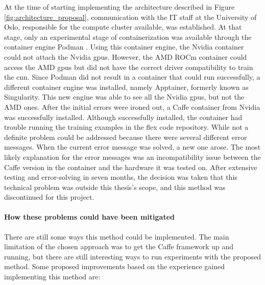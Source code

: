             At the time of starting implementing the architecture described in Figure \ref{fig:architecture_proposal}, communication with the IT staff at the University of Oslo, responsible for the compute cluster available, was established. At that stage, only an experimental stage of containerization was available through the container engine Podman \cite{Podman}. Using this container engine, the Nvidia container could not attach the Nvidia \glspl{gpu}. However, the AMD ROCm container could access the AMD \glspl{gpu} but did not have the correct driver compatibility to train the \gls{cnn}. Since Podman did not result in a container that could run successfully, a different container engine was installed, namely Apptainer, formerly known as Singularity. This new engine was able to see all the Nvidia \glspl{gpu}, but not the AMD ones. After the initial errors were ironed out, a Caffe container from Nvidia was successfully installed. Although successfully installed, the container had trouble running the training examples in the \gls{flex} code repository. While not a definite problem could be addressed because there were several different error messages. When the current error message was solved, a new one arose. The most likely explanation for the error messages was an incompatibility issue between the Caffe version in the container and the hardware it was tested on. After extensive testing and error-solving in seven months, the decision was taken that this technical problem was outside this thesis's scope, and this method was discontinued for this project. 
            

            
            \paragraph{How these problems could have been mitigated\\}

            There are still some ways this method could be implemented. The main limitation of the chosen approach was to get the Caffe framework up and running, but there are still interesting ways to run experiments with the proposed method. Some proposed improvements based on the experience gained implementing this method are:


